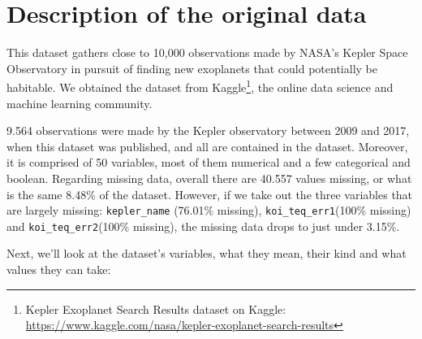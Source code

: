 
\section{Description of the original data}%
\label{sec:desc-orig}

This dataset gathers close to 10,000 observations made by NASA's 
Kepler Space Observatory in pursuit of finding new exoplanets that
could potentially be habitable. 
We obtained the dataset from Kaggle\footnote{Kepler Exoplanet Search Results 
dataset on Kaggle:
\url{https://www.kaggle.com/nasa/kepler-exoplanet-search-results}},
the online data science and machine learning community.

9.564 observations were made by the Kepler observatory between 2009 and
2017, when this dataset was published, and all are contained in the dataset.
Moreover, it is comprised of 50 variables, most of them numerical and a few
categorical and boolean. Regarding missing data, overall there are 40.557 values
missing, or what is the same 8.48\% of the dataset. However, if we take out the
three variables that are largely missing: \texttt{kepler\_name}
(76.01\% missing), \texttt{koi\_teq\_err1}(100\% missing) and 
\texttt{koi\_teq\_err2}(100\% missing), the missing data drops
to just under 3.15\%.

Next, we'll look at the dataset's variables, what they mean, their kind
and what values they can take:

\newcommand{\dd}{\textsuperscript{\ddag}}

